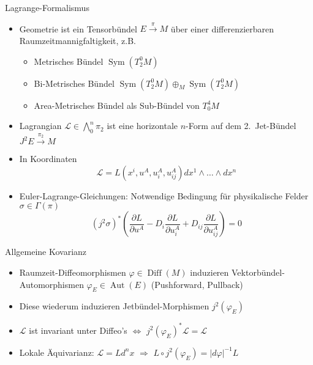 \documentclass{beamer}
\begin{document}
    \begin{frame}{Lagrange-Formalismus}
        \begin{itemize}
            \item Geometrie ist ein Tensorbündel $E \xrightarrow{\pi} M$ über einer differenzierbaren
            Raumzeitmannigfaltigkeit, z.B.\ \pause
            \begin{itemize}
                \item Metrisches Bündel $\operatorname{Sym}(T^0_2 M)$ \pause
                \item Bi-Metrisches Bündel $\operatorname{Sym}(T^0_2 M) \oplus_M \operatorname{Sym}(T^0_2 M)$ \pause
                \item Area-Metrisches Bündel als Sub-Bündel von $T^4_0 M$ \pause
            \end{itemize}
            \item Lagrangian $\mathscr L \in \bigwedge^n_0 \pi_2$ ist eine horizontale $n$-Form auf dem
            2.\ Jet-Bündel $J^2 E \xrightarrow{\pi_2} M$ \pause
            \item {\setlength{\belowdisplayskip}{-10pt}In Koordinaten
                \[ \mathscr{L} = L(x^i, u^A, u^A_i, u^A_{ij}) dx^1 \wedge \dots \wedge dx^n \]} \pause
            \item Euler-Lagrange-Gleichungen: Notwendige Bedingung für physikalische Felder $\sigma\in\Gamma(\pi)$
            \[ (j^2\sigma)^\ast \left( \frac{\partial L}{\partial u^A} - D_i \frac{\partial L}{\partial u^A_i} + D_{ij} \frac{\partial L}{\partial u^A_{ij}}\right) = 0 \]
        \end{itemize}
    \end{frame}

    \begin{frame}{Allgemeine Kovarianz}
        \begin{itemize}
            \item Raumzeit-Diffeomorphismen $\varphi\in\operatorname{Diff}(M)$ induzieren Vektorbündel-Automorphismen
            $\varphi_E\in\operatorname{Aut}(E)$ (Pushforward, Pullback) \pause
            \item Diese wiederum induzieren Jetbündel-Morphismen $j^2(\varphi_E)$ \pause
            \item $\mathscr L$ ist invariant unter Diffeo's \pause $\Leftrightarrow$ \alert{$j^2(\varphi_E)^\ast\mathscr{L} = \mathscr{L}$} \pause
            \item Lokale Äquivarianz: $\mathscr L = L d^n x$ \pause $\Rightarrow$ \alert{$L\circ j^2(\varphi_E) = \lvert d\varphi\rvert^{-1} L$}
        \end{itemize}
    \end{frame}
\end{document}
